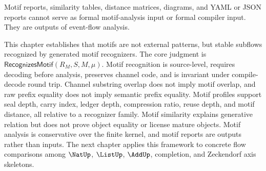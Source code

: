 \begin{principle}
\label{prin:motif-generated-reports-output-not-input}
Motif reports, similarity tables, distance matrices, diagrams, and YAML or JSON reports cannot serve as formal motif-analysis input or formal compiler input. They are outputs of event-flow analysis.
\end{principle}

\begin{remark}[Outlook]
\label{rem:motif-generated-outlook}
This chapter establishes that motifs are not external patterns, but stable subflows recognized by generated motif recognizers. The core judgment is $\mathsf{RecognizesMotif}(R_M,S,M,\mu)$. Motif recognition is source-level, requires decoding before analysis, preserves channel code, and is invariant under compile-decode round trip. Channel substring overlap does not imply motif overlap, and raw prefix equality does not imply semantic prefix equality. Motif profiles support seal depth, carry index, ledger depth, compression ratio, reuse depth, and motif distance, all relative to a recognizer family. Motif similarity explains generative relation but does not prove object equality or license mature objects. Motif analysis is conservative over the finite kernel, and motif reports are outputs rather than inputs. The next chapter applies this framework to concrete flow comparisons among $\NatUp$, $\ListUp$, $\AddUp$, completion, and Zeckendorf axis skeletons.
\end{remark}
